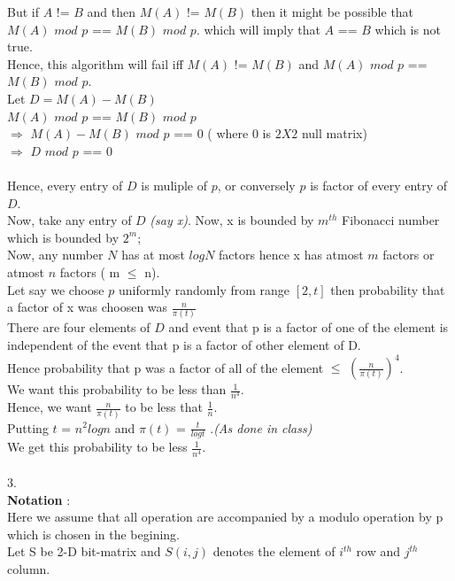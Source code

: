 \documentclass{article}
\begin{document}
But if $A$ != $B$ and then $M(A)$ != $M(B)$ then it might be possible that $M(A)$ $mod$ $p$ == $M(B)$ $mod$ $p$. which will imply that $A$ == $B$ which is not true. \\
Hence, this algorithm will fail iff $M(A)$ != $M(B)$ and $M(A)$ $mod$ $p$ == $M(B)$ $mod$ $p$. \\ 
Let $D = M(A) - M(B)$ \\ 
$M(A)$ $mod$ $p$ == $M(B)$ $mod$ $p$ \\
$\Longrightarrow$ $M(A) - M(B)$ $mod$ $p$ == $0$ ( where $0$ is $2 X 2$ null matrix) \\
$\Longrightarrow$ $D$ $mod$ $p$ == $0$ \\\\
Hence, every entry of $D$ is muliple of $p$, or conversely $p$ is factor of every entry of $D$. \\
Now, take any entry of $D$ \textit{(say x)}. Now, x is bounded by $m^{th}$ Fibonacci number which is bounded by $2^{m}$; \\
Now, any number $N$ has at most $logN$ factors hence x has atmost $m$ factors or atmost $n$ factors ( m $\leq$ n). \\ 
Let say we choose $p$ uniformly randomly from range $[2,t]$ then probability that a factor of x was choosen was $\frac{n}{\pi(t)}$ \\
There are four elements of $D$ and event that p is a factor of one of the element is independent of the event that p is a factor of other element of D. \\ 
Hence probability that p was a factor of all of the element $\leq$ 
$(\frac{n}{\pi(t)})^{4}$.\\ 
We want this probability to be less than $\frac{1}{n^{4}}$. \\
Hence, we want $\frac{n}{\pi(t)}$ to be less that $\frac{1}{n}$. \\ 
Putting $t$ = $n^{2}logn$ 
and $\pi(t)$ = $\frac{t}{logt}$ .\hfill{\textit{(As done in class)} }   \\
We get this probability to be less $\frac{1}{n^{4}}$.\\\\
3. \\
\textbf{Notation} : \\
Here we assume that all operation are accompanied by a modulo operation by p which is chosen in the begining. \\ 
Let S be 2-D bit-matrix and $S(i,j)$ denotes the element of $i^{th}$ row and $j^{th}$ column. \\
\end{document}
